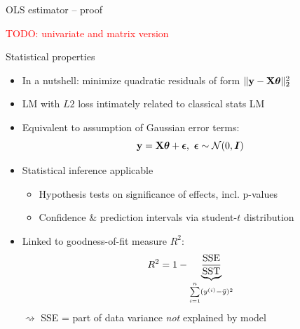 \documentclass[11pt,compress,t,notes=noshow, xcolor=table]{beamer}
\begin{document}

\begin{vbframe}{OLS estimator -- proof}

\textcolor{red}{TODO: univariate and matrix version}

\end{vbframe}


\begin{vbframe}{Statistical properties}

\begin{itemize}
    \item In a nutshell: minimize quadratic residuals of form 
    $\| \mathbf{y} - \mathbf{X} \bm{\theta} \|^2_2$
    \item LM with $L2$ loss intimately related to classical stats LM
        \item Equivalent to assumption of Gaussian error terms: 
        $$\mathbf{y} = \mathbf{X} \bm{\theta} + \bm{\epsilon}, ~ \bm{\epsilon} \sim 
        \mathcal{N}(0, \boldsymbol{I})$$
        \item Statistical inference applicable
        \begin{itemize}
            \item Hypothesis tests on significance of effects, incl. p-values
            \item Confidence \& prediction intervals via student-$t$ 
            distribution
        \end{itemize}
        \item Linked to goodness-of-fit measure $R^2$:
        $$R^2 = 1 - \underbrace{\frac{\text{SSE}}{\text{SST}}}_{
        \sum\limits_{i=1}^n (y^{(i)} - \bar y)^2}$$
        $\rightsquigarrow$ SSE = part of data variance \textit{not} explained 
        by model
\end{itemize}

\end{vbframe}

\endlecture
\end{document}
